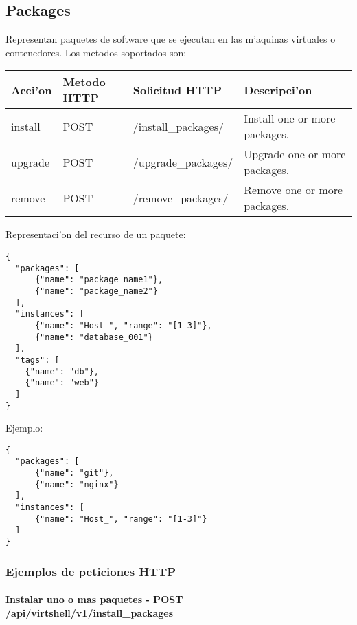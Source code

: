 \subsection{Packages}
Representan paquetes de software que se ejecutan en las m'aquinas virtuales o contenedores. Los metodos soportados son:

\begin{center}
 \begin{tabular}{| l | l | l | l |}
 \hline
  \rowcolor{blueapi}
  \textbf{Acci'on} & \textbf{Metodo HTTP} & \textbf{Solicitud HTTP} & \textbf{Descripci'on} \\ [0.5ex] 
  \hline\hline
  install & POST & /install\_packages/ & Install one or more packages. \\
  \hline
  upgrade & POST & /upgrade\_packages/ & Upgrade one or more packages. \\
  \hline
  remove & POST & /remove\_packages/ & Remove one or more packages. \\ [1ex] 
  \hline
\end{tabular}
\end{center}

\vspace{1cm}
Representaci'on del recurso de un paquete:
\vspace{1cm}

\begin{lstlisting}[style=json]
{
  "packages": [
      {"name": "package_name1"},
      {"name": "package_name2"}
  ],
  "instances": [ 
      {"name": "Host_", "range": "[1-3]"}, 
      {"name": "database_001"}
  ],
  "tags": [
    {"name": "db"},
    {"name": "web"}
  ]
}
\end{lstlisting}

Ejemplo:

\medskip
\begin{lstlisting}[style=json]
{
  "packages": [
      {"name": "git"},
      {"name": "nginx"}
  ],
  "instances": [ 
      {"name": "Host_", "range": "[1-3]"}
  ]
}
\end{lstlisting}

\subsubsection{Ejemplos de peticiones HTTP}

\paragraph{Instalar uno o mas paquetes - POST /api/virtshell/v1/install\_packages} ~\\

